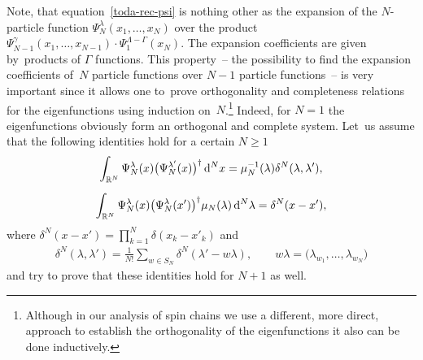 \documentclass[pdftex]{sigma}%
\numberwithin{equation}{section}
\begin{document}
Note, that equation~\eqref{toda-rec-psi} is nothing other as the expansion of the $N$-particle function $\Psi^{\lambda}_{N}(x_1,\dots,x_N)$ over
the product $\Psi^{\gamma}_{N-1}(x_1,\dots,x_{N-1})\cdot \Psi_1^{\Lambda-\Gamma}(x_N)$. The expansion coefficients are given by~pro\-ducts of
$\Gamma$ functions. This property~-- the possibility to find the expansion coefficients of~$N$ particle functions over $N-1$ particle
functions~-- is very important since it allows one to~prove orthogonality and completeness relations for the eigenfunctions using induction
on~$N$.\footnote{Although in our analysis of spin chains we use a different, more direct, approach to establish the orthogonality of the
eigenfunctions it also can be done inductively.} Indeed, for $N=1$ the eigenfunctions obviously form an orthogonal and complete system.
Let~us assume that the following identities hold for a certain $N\geq 1$
\begin{subequations}
\begin{gather}\label{Toda-perp}
\int_{\mathbb R^N} \Psi_N^\lambda(x) \big(\Psi_N^{\lambda'}(x)\big)^\dagger\, {\rm d}^Nx =
 \mu^{-1}_N(\lambda) \delta^N(\lambda, \lambda'),
\\[2mm]
\label{Toda-compl}
\int_{\mathbb R^N} \Psi_N^\lambda(x) \big(\Psi_N^{\lambda}(x')\big)^\dagger\mu_N(\lambda)\, {\rm d}^N\lambda =\delta^N(x-x'),
\end{gather}
\end{subequations}
where $\delta^N(x-x')=\prod_{k=1}^N\delta(x_k-x'_k)$ and{\samepage
\begin{gather}\label{deltaN}
\delta^N(\lambda, \lambda')=\frac1{N!}\sum_{w\in S_N} \delta^N(\lambda'-w\lambda), \qquad w\lambda=\big(\lambda_{w_1},\dots, \lambda_{w_N}\big)
\end{gather}
and try to prove that these identities hold for $N+1$ as well.}
\end{document}
